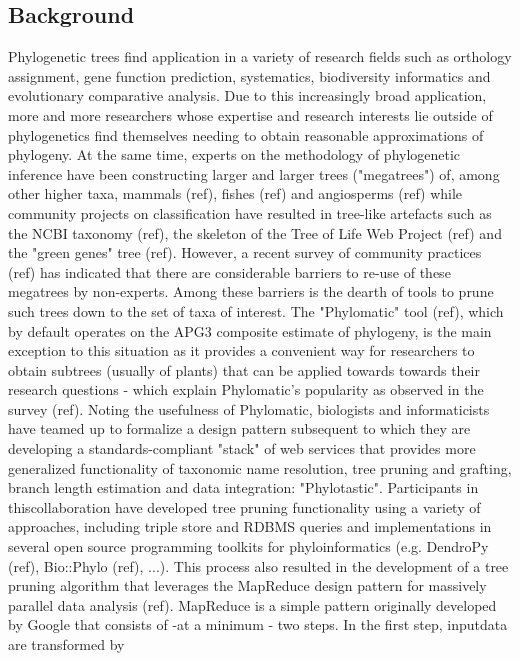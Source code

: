 \documentclass[10pt]{bmc_article}
\newenvironment{bmcformat}{\begin{raggedright}\baselineskip20pt\sloppy\setboolean{publ}{false}}{\end{raggedright}\baselineskip20pt\sloppy}
\begin{document}
\begin{bmcformat}
\section*{Background}
Phylogenetic trees find application in a variety of research fields such as
orthology assignment, gene function prediction, systematics, biodiversity 
informatics and evolutionary comparative analysis. Due to this increasingly 
broad application, more and more researchers whose expertise and research 
interests lie outside of phylogenetics find themselves needing to obtain 
reasonable approximations of phylogeny. At the same time, experts on the 
methodology of phylogenetic inference have been constructing larger and 
larger trees ("megatrees") of, among other higher taxa, mammals (ref), 
fishes (ref) and angiosperms (ref) while community projects on classification 
have resulted in tree-like artefacts such as the NCBI taxonomy (ref), the 
skeleton of the Tree of Life Web Project (ref) and the "green genes" tree (ref). 
However, a recent survey of community practices (ref) has indicated that there 
are considerable barriers to re-use of these megatrees by non-experts. Among 
these barriers is the dearth of tools to prune such trees down to the set of 
taxa of interest. The "Phylomatic" tool (ref), which by default operates on the APG3 composite estimate of phylogeny, is the main exception to this situation as it provides a convenient way for researchers to obtain subtrees (usually of plants) that can be applied towards towards their research questions - which explain Phylomatic's popularity as observed in the survey (ref). Noting the usefulness of Phylomatic, biologists and informaticists have teamed up to formalize a design pattern subsequent to which they are developing a standards-compliant "stack" of web services that provides more generalized functionality of taxonomic name resolution, tree pruning and grafting, branch length estimation and data integration: "Phylotastic". Participants in thiscollaboration have developed tree pruning functionality using a variety of approaches, including triple store and RDBMS queries and implementations in several open source programming toolkits for phyloinformatics (e.g. DendroPy (ref), Bio::Phylo (ref), ...). This process also resulted in the development of a tree pruning algorithm that leverages the MapReduce design pattern for massively parallel data analysis (ref). MapReduce is a simple pattern originally developed by Google that consists of -at a minimum - two steps. In the first step, inputdata are transformed by 

\end{bmcformat}
\end{document}
